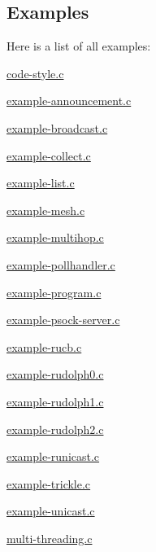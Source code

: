 \subsection{Examples}
Here is a list of all examples\+:\begin{DoxyCompactItemize}
\item 
\hyperlink{a00002}{code-\/style.\+c}
\item 
\hyperlink{a00014}{example-\/announcement.\+c}
\item 
\hyperlink{a00016}{example-\/broadcast.\+c}
\item 
\hyperlink{a00018}{example-\/collect.\+c}
\item 
\hyperlink{a00008}{example-\/list.\+c}
\item 
\hyperlink{a00020}{example-\/mesh.\+c}
\item 
\hyperlink{a00022}{example-\/multihop.\+c}
\item 
\hyperlink{a00006}{example-\/pollhandler.\+c}
\item 
\hyperlink{a00004}{example-\/program.\+c}
\item 
\hyperlink{a00010}{example-\/psock-\/server.\+c}
\item 
\hyperlink{a00024}{example-\/rucb.\+c}
\item 
\hyperlink{a00026}{example-\/rudolph0.\+c}
\item 
\hyperlink{a00028}{example-\/rudolph1.\+c}
\item 
\hyperlink{a00030}{example-\/rudolph2.\+c}
\item 
\hyperlink{a00032}{example-\/runicast.\+c}
\item 
\hyperlink{a00034}{example-\/trickle.\+c}
\item 
\hyperlink{a00036}{example-\/unicast.\+c}
\item 
\hyperlink{a00012}{multi-\/threading.\+c}
\end{DoxyCompactItemize}
